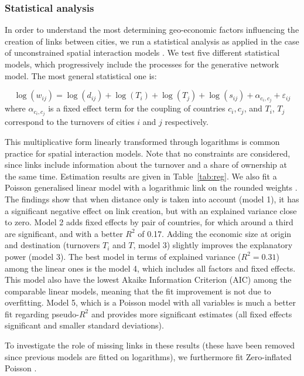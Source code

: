 \documentclass[10pt,letterpaper]{article}
\begin{document}
\subsubsection*{Statistical analysis}

In order to understand the most determining geo-economic factors influencing the creation of links between cities, we run a statistical analysis as applied in the case of unconstrained spatial interaction models \cite{wilson1975some}. We test five different statistical models, which progressively include the processes for the generative network model. The most general statistical one is:

\begin{equation}
\log(w_{ij}) = \log(d_{ij}) + \log(T_i) + \log(T_j) + \log(s_{ij}) + \alpha_{c_i,c_j} + \varepsilon_{ij}
\end{equation}
where $\alpha_{c_i,c_j}$ is a fixed effect term for the coupling of countries $c_i,c_j$, and $T_i$, $T_j$ correspond to the turnovers of cities $i$ and $j$ respectively. 

This multiplicative form linearly transformed through logarithms is common practice for spatial interaction models. Note that no constraints are considered, since links include information about the turnover and a share of ownership at the same time. Estimation results are given in Table~\ref{tab:reg}. We also fit a Poisson generalised linear model with a logarithmic link on the rounded weights \cite{flowerdew1988fitting}. The findings show that when distance only is taken into account (model 1), it has a significant negative effect on link creation, but with an explained variance close to zero. Model 2 adds fixed effects by pair of countries, for which around a third are significant, and with a better $R^2$ of 0.17. Adding the economic size at origin and destination (turnovers $T_i$ and $T$, model 3) slightly improves the explanatory power (model 3). The best model in terms of explained variance ($R^2 = 0.31$) among the linear ones is the model 4, which includes all factors and fixed effects. This model also have the lowest Akaike Information Criterion (AIC) among the comparable linear models, meaning that the fit improvement is not due to overfitting. Model 5, which is a Poisson model with all variables is much a better fit regarding pseudo-$R^2$ and provides more significant estimates (all fixed effects significant and smaller standard deviations).

To investigate the role of missing links in these results (these have been removed since previous models are fitted on logarithms), we furthermore fit Zero-inflated Poisson \cite{lambert1992zero}. %
\end{document}
